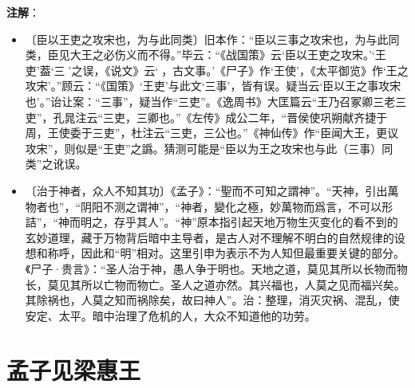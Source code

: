 \documentclass[12pt,UTF-8,openany]{ctexbook}
\begin{document}
\newpage

\textbf{注解}：

\vspace{-1em}

\begin{itemize}
    \setlength\itemsep{-0.2em}
    \item〔臣以王吏之攻宋也，为与此同类〕旧本作：“臣以三事之攻宋也，为与此同类，臣见大王之必伤义而不得。”毕云：“《战国策》云‘臣以王吏之攻宋。’‘王吏’葢‘三𠭏’之误，《说文》云‘𠭏，古文事。’《尸子》作‘王使’，《太平御览》作‘王之攻宋’。”顾云：“《国策》‘王吏’与此文‘三事’，皆有误。疑当云‘臣以王之事攻宋也’。”诒让案：“三事”，疑当作“三吏”。《逸周书》大匡篇云“王乃召冢卿三老三吏”，孔晁注云“三吏，三卿也。”《左传》成公二年，“晋侯使巩朔献齐捷于周，王使委于三吏”，杜注云“三吏，三公也。”《神仙传》作“臣闻大王，更议攻宋”，则似是“王吏”之譌。猜测可能是“臣以为王之攻宋也与此（三事）同类”之讹误。
    \item〔治于神者，众人不知其功〕《孟子》：“聖而不可知之謂神”。“天神，引出萬物者也”，“阴阳不测之谓神”，“神者，變化之極，妙萬物而爲言，不可以形詰”，“神而明之，存乎其人”。“神”原本指引起天地万物生灭变化的看不到的玄妙道理，藏于万物背后暗中主导者，是古人对不理解不明白的自然规律的设想和称呼，因此和“明”相对。这里引申为表示不为人知但最重要关键的部分。《尸子·贵言》：“圣人治于神，愚人争于明也。天地之道，莫见其所以长物而物长，莫见其所以亡物而物亡。圣人之道亦然。其兴福也，人莫之见而福兴矣。其除祸也，人莫之知而祸除矣，故曰神人”。治：整理，消灭灾祸、混乱，使安定、太平。暗中治理了危机的人，大众不知道他的功劳。
\end{itemize}

\chapter{孟子见梁惠王}
\end{document}

